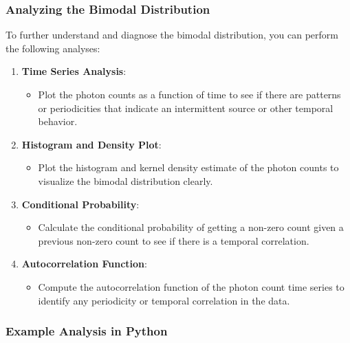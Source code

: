 \hypertarget{analyzing-the-bimodal-distribution}{%
\subsubsection{Analyzing the Bimodal
Distribution}\label{analyzing-the-bimodal-distribution}}

To further understand and diagnose the bimodal distribution, you can
perform the following analyses:

\begin{enumerate}
\def\labelenumi{\arabic{enumi}.}
\tightlist
\item
  \textbf{Time Series Analysis}:

  \begin{itemize}
  \tightlist
  \item
    Plot the photon counts as a function of time to see if there are
    patterns or periodicities that indicate an intermittent source or
    other temporal behavior.
  \end{itemize}
\item
  \textbf{Histogram and Density Plot}:

  \begin{itemize}
  \tightlist
  \item
    Plot the histogram and kernel density estimate of the photon counts
    to visualize the bimodal distribution clearly.
  \end{itemize}
\item
  \textbf{Conditional Probability}:

  \begin{itemize}
  \tightlist
  \item
    Calculate the conditional probability of getting a non-zero count
    given a previous non-zero count to see if there is a temporal
    correlation.
  \end{itemize}
\item
  \textbf{Autocorrelation Function}:

  \begin{itemize}
  \tightlist
  \item
    Compute the autocorrelation function of the photon count time series
    to identify any periodicity or temporal correlation in the data.
  \end{itemize}
\end{enumerate}

\hypertarget{example-analysis-in-python}{%
\subsubsection{Example Analysis in
Python}\label{example-analysis-in-python}}

